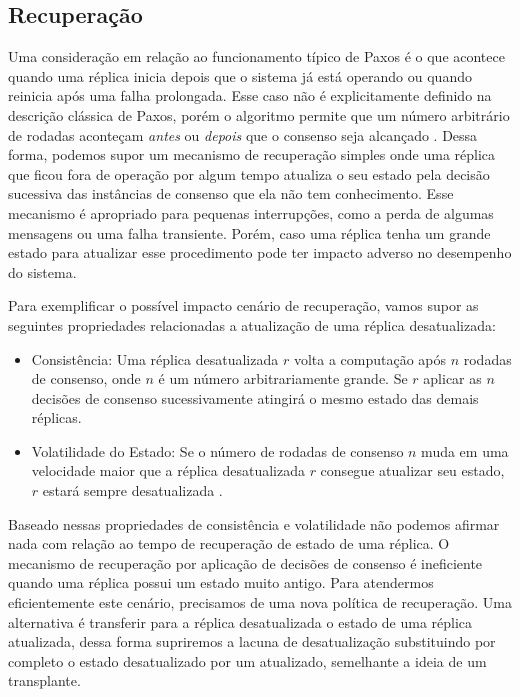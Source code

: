 \subsection{Recuperação}

Uma consideração em relação ao funcionamento típico de Paxos é o que acontece
quando uma réplica inicia depois que o sistema já está operando ou quando reinicia após
uma falha prolongada. Esse caso não é explicitamente definido na descrição clássica de
Paxos, porém o algoritmo permite que um número arbitrário de rodadas aconteçam
\emph{antes} ou \emph{depois} que o consenso seja alcançado \cite{lamport98}. Dessa forma,
podemos supor um mecanismo de recuperação simples onde uma réplica que ficou fora de
operação por algum tempo atualiza o seu estado pela decisão sucessiva das instâncias de
consenso que ela não tem conhecimento. Esse mecanismo é apropriado para pequenas
interrupções, como a perda de algumas mensagens ou uma falha transiente. Porém, caso uma
réplica tenha um grande estado para atualizar esse procedimento pode ter impacto adverso
no desempenho do sistema.

Para exemplificar o possível impacto cenário de recuperação, vamos supor as seguintes
propriedades relacionadas a atualização de uma réplica desatualizada:

\begin{itemize}
  \item Consistência: Uma réplica desatualizada $r$ volta a computação após $n$ rodadas de
    consenso, onde $n$ é um número arbitrariamente grande. Se $r$ aplicar as $n$ decisões
    de consenso sucessivamente atingirá o mesmo estado das demais réplicas.
  \item Volatilidade do Estado: Se o número de rodadas de consenso $n$ muda em uma
    velocidade maior que a réplica desatualizada $r$ consegue atualizar seu estado, $r$
    estará sempre desatualizada \cite{vilaca09}.
\end{itemize}

Baseado nessas propriedades de consistência e volatilidade não podemos afirmar nada com
relação ao tempo de recuperação de estado de uma réplica. O mecanismo de recuperação por
aplicação de decisões de consenso é ineficiente quando uma réplica possui um estado muito
antigo. Para atendermos eficientemente este cenário, precisamos de uma nova política de
recuperação. Uma alternativa é transferir para a réplica desatualizada o estado de uma
réplica atualizada, dessa forma supriremos a lacuna de desatualização substituindo por
completo o estado desatualizado por um atualizado, semelhante a ideia de um transplante.

